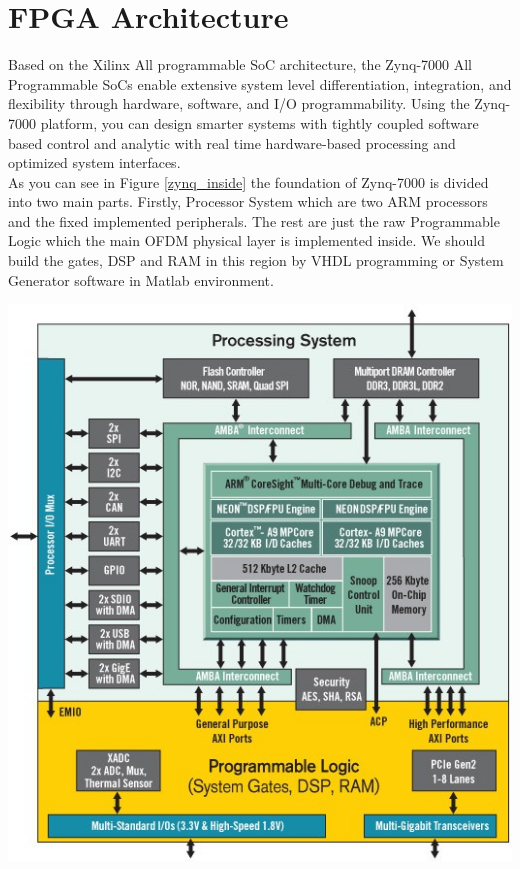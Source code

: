 \section{FPGA Architecture}
\label{fpga_arch}
Based on the Xilinx All programmable SoC architecture, the Zynq-7000 All Programmable SoCs enable extensive system level differentiation, integration, and flexibility through hardware, software, and I/O programmability. Using the Zynq-7000 platform, you can design smarter systems with tightly coupled software based control and analytic with real time hardware-based processing and optimized system interfaces.\\
As you can see in Figure \ref{zynq_inside} the foundation of Zynq-7000 is divided into two main parts. Firstly, Processor System which are two ARM processors and the fixed implemented peripherals. The rest are just the raw Programmable Logic which the main OFDM physical layer is implemented inside. We should build the gates, DSP and RAM in this region by VHDL programming or System Generator software in Matlab environment.\\


\begin{center}
\includegraphics[width=\textwidth]{content/fig/zynq_inside.JPG}
\label{zynq_inside}
\end{center}

